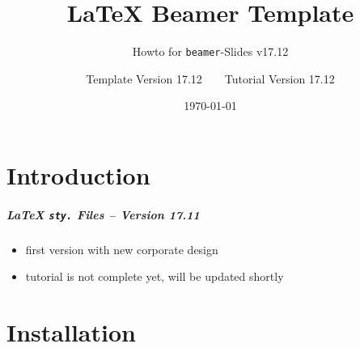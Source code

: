 \documentclass[
t, %
10pt, %
aspectratio=1610, %
ngerman,
english,
]{beamer}
\title{\LaTeX{} Beamer Template}
\subtitle{Howto for {\tt beamer}-Slides v17.12}
\author{Template Version 17.12~~\vrule width0.3pt~~Tutorial Version 17.12}
\institute[My Institute]{My Institute}
\date{\today}
\begin{document}
\maketitle

\maketitle

\part{Introduction}
\makepart

\begin{frame}[label=introduction]
	\frametitle{{\LaTeX} {\tt sty.} Files -- Version 17.11}
	\begin{itemize}
	  \item first version with new corporate design
	  \item tutorial is not complete yet, will be updated shortly
	\end{itemize}
\end{frame}

\part{Installation}
\makepart
\end{document}
